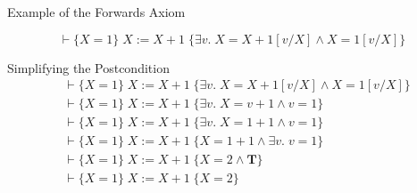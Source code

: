 \begin{frame}{Example of the Forwards Axiom}
    \begin{example}
        \[ \vdash \{X=1\} \; X := X+1 \; \{\exists v. \; X = X+1[v/X] \wedge X=1[v/X]\} \]
    \end{example}
    
    \begin{block}{Simplifying the Postcondition}
        \begin{align*}
            & \vdash \{X=1\} \; X := X+1 \; \{\exists v. \; X = X+1[v/X] \wedge X=1[v/X]\} \\
            & \vdash \{X=1\} \; X := X+1 \; \{\exists v. \; X = v + 1 \wedge v = 1\} \\
            & \vdash \{X=1\} \; X := X+1 \; \{\exists v. \; X = 1 + 1 \wedge v = 1\} \\
            & \vdash \{X=1\} \; X := X+1 \; \{X = 1 + 1 \wedge \exists v. \; v = 1\} \\
            & \vdash \{X=1\} \; X := X+1 \; \{X = 2 \wedge \mathbf{T}\} \\
            & \vdash \{X=1\} \; X := X+1 \; \{X = 2\}
        \end{align*}
    \end{block}
\end{frame}

